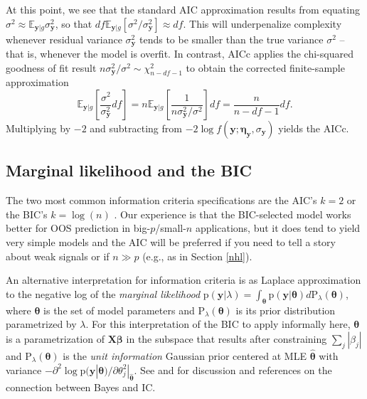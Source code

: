 \documentclass[12pt]{article}
\newcommand{\bs}[1]{\boldsymbol{#1}}
\newcommand{\mr}[1]{\mathrm{#1}}
\newcommand{\bm}[1]{\mathbf{#1}}
\newcommand{\ds}[1]{\mathds{#1}}
\begin{document}
At this point, we see that the standard AIC approximation results from equating $\sigma^2 \approx \ds{E}_{\bm{y}|g}\sigma^2_{\bm{y}}$, so that $df\ds{E}_{\bm{y}|g}[\sigma^2/\sigma^2_{\bm{y}}] \approx df$.  This will underpenalize complexity whenever residual variance $\sigma^2_{\bm{y}}$ tends to be smaller than the true variance $\sigma^2$  -- that is, whenever the model is overfit.  In contrast, AICc applies the chi-squared goodness of fit result $
{n\sigma^2_{\bm{y}}/\sigma^2} \sim \chi^2_{n-df-1}
$
to obtain the corrected finite-sample approximation
\begin{equation}
\ds{E}_{\bm{y}|g}\left[\frac{\sigma^2 }{\sigma^2_{\bm{y}}}df\right]= 
n\ds{E}_{\bm{y}|g}\left[\frac{1}{n\sigma^2_{\bm{y}}/\sigma^2}\right]df = 
\frac{n}{n-df-1}df.
\end{equation}
Multiplying by $-2$ and subtracting from $-2\log f(\bm{y}; \bs{\eta}_{\bm{y}},\sigma_{\bm{y}})$ yields the AICc.


\subsection{Marginal likelihood and the BIC}

The two most common information criteria specifications are the AIC's $k=2$
\citep[derived from information theoretic arguments
in][]{akaike_information_1973} or the BIC's $k=\log(n)$ \citep[derived from
approximation to marginal likelihood for a Bayesian model
in][]{schwarz_estimating_1978}.  Our experience is that the BIC-selected model
works better  for OOS prediction in big-$p$/small-$n$ applications, but it does tend to yield very simple models and the
AIC will be preferred if you need to tell a story about weak signals or if $n\gg p$ 
(e.g., as in Section \ref{nhl}).  

An alternative  interpretation for information criteria is as Laplace
approximation \citep{de_bruijn_asymptotic_1958} to the negative log of the
{\it marginal likelihood} $\mr{p}(\bm{y} | \lambda) = \int_{\bs{\theta}}
\mr{p}( \bm{y} | \bs{\theta} ) d\mr{P}_\lambda(\bs{\theta})$, where
$\bs{\theta}$ is the set of model parameters and
$\mr{P}_\lambda(\bs{\theta})$ is its prior distribution parametrized by
 $\lambda$. For this interpretation of the BIC to apply
informally here, $\bs{\theta}$ is a 
parametrization of $\bm{X}\bs{\beta}$ in the subspace that results after constraining $\sum_j |\beta_j|$  and $\mr{P}_\lambda(\bs{\theta})$ is the
{\it unit information} Gaussian prior centered at  MLE $\bs{\hat\theta}$ with
variance $-\partial^2\log\mr{p}(\bm{y}| \bs{\theta} )/\partial\theta_j^2
|_{\bs{\hat\theta}}$. See \citet{kass_bayes_1995} and
\citet{spiegelhalter_bayesian_2002} for discussion and references on the
connection between Bayes and IC.
\end{document}
